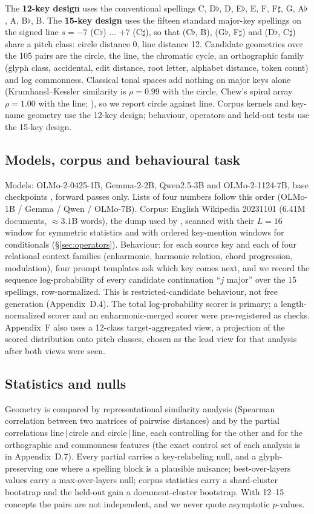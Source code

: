 \documentclass[11pt]{article}
\newcommand{\fl}{$\flat$}
\newcommand{\sh}{$\sharp$}
\newcommand{\lc}{line$\,|\,$circle}
\newcommand{\cl}{circle$\,|\,$line}
\begin{document}
The \textbf{12-key design} uses the conventional spellings C, D\fl, D, E\fl, E, F, F\sh, G, A\fl, A, B\fl, B. The \textbf{15-key design} uses the fifteen standard major-key spellings on the signed line $s=-7$ (C\fl) $\ldots$ $+7$ (C\sh), so that (C\fl, B), (G\fl, F\sh) and (D\fl, C\sh) share a pitch class: circle distance 0, line distance 12. Candidate geometries over the 105 pairs are the circle, the line, the chromatic cycle, an orthographic family (glyph class, accidental, edit distance, root letter, alphabet distance, token count) and log commonness. Classical tonal spaces add nothing on major keys alone (Krumhansl--Kessler similarity is $\rho=0.99$ with the circle, Chew's spiral array $\rho=1.00$ with the line; \citealp{krumhansl1982tracing,chew2000towards}), so we report circle against line. Corpus kernels and key-name geometry use the 12-key design; behaviour, operators and held-out tests use the 15-key design.

\subsection{Models, corpus and behavioural task}
Models: OLMo-2-0425-1B, Gemma-2-2B, Qwen2.5-3B and OLMo-2-1124-7B, base checkpoints \citep{olmo2,gemma2,qwen25}, forward passes only. Lists of four numbers follow this order (OLMo-1B / Gemma / Qwen / OLMo-7B). Corpus: English Wikipedia 20231101 (6.41M documents, $\approx3.1$B words), the dump used by \citet{karkada2026symmetry}, scanned with their $L=16$ window for symmetric statistics and with ordered key-mention windows for conditionals (\S\ref{sec:operators}). Behaviour: for each source key and each of four relational context families (enharmonic, harmonic relation, chord progression, modulation), four prompt templates ask which key comes next, and we record the sequence log-probability of every candidate continuation ``$j$ major'' over the 15 spellings, row-normalized. This is restricted-candidate behaviour, not free generation (Appendix~D.4). The total log-probability scorer is primary; a length-normalized scorer and an enharmonic-merged scorer were pre-registered as checks. Appendix~F also uses a 12-class target-aggregated view, a projection of the scored distribution onto pitch classes, chosen as the lead view for that analysis after both views were seen.

\subsection{Statistics and nulls}
Geometry is compared by representational similarity analysis (Spearman correlation between two matrices of pairwise distances) and by the partial correlations \lc{} and \cl{}, each controlling for the other and for the orthographic and commonness features (the exact control set of each analysis is in Appendix~D.7). Every partial carries a key-relabeling null, and a glyph-preserving one where a spelling block is a plausible nuisance; best-over-layers values carry a max-over-layers null; corpus statistics carry a shard-cluster bootstrap and the held-out gain a document-cluster bootstrap. With 12--15 concepts the pairs are not independent, and we never quote asymptotic $p$-values.
\end{document}
